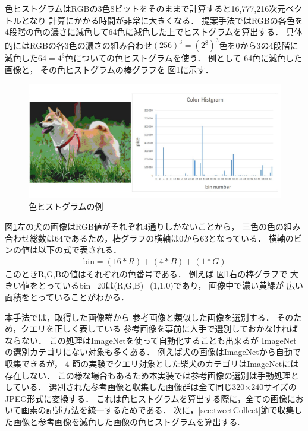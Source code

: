 \documentclass{deimj}
\begin{document}
色ヒストグラムはRGBの3色8ビットをそのままで計算すると16,777,216次元ベクトルとなり
計算にかかる時間が非常に大きくなる．
提案手法ではRGBの各色を4段階の色の濃さに減色して64色に減色した上でヒストグラムを算出する．
具体的にはRGBの各3色の濃さの組み合わせ$(256)^3=(2^8)^3$色を0から3の4段階に減色した$64=4^3$色についての色ヒストグラムを使う．
例として
64色に減色した画像と，
その色ヒストグラムの棒グラフを
図\ref{fig:color}に示す．
%
\begin{figure}[tb]
 \begin{center}
  \includegraphics[scale=0.28]{colorhist.jpg}
 \end{center}
 \caption{色ヒストグラムの例}
 \label{fig:color}
\end{figure}
%
%
図\ref{fig:color}左の犬の画像はRGB値がそれぞれ4通りしかないことから，
三色の色の組み合わせ総数は64であるため，棒グラフの横軸は0から63となっている．
横軸のビンの値は以下の式で表される．
\begin{eqnarray}
\mbox{bin} = (16 * R) + (4 * B) + (1 * G)
\end{eqnarray}
このときR,G,Bの値はそれぞれの色番号である．
例えば
図\ref{fig:color}右の棒グラフで
大きい値をとっているbin=20は(R,G,B)=(1,1,0)であり，
画像中で濃い黄緑が
広い面積をとっていることがわかる．

本手法では，取得した画像群から
参考画像と類似した画像を選別する．
そのため，クエリを正しく表している
参考画像を事前に人手で選別しておかなければならない．
この処理はImageNetを使って自動化することも出来るが
ImageNetの選別カテゴリにない対象も多くある．
例えば犬の画像はImageNetから自動で収集できるが，
4
節の実験でクエリ対象とした柴犬のカテゴリはImageNetには存在しない．
この様な場合もあるため本実装では参考画像の選別は手動処理としている．
%
選別された参考画像と収集した画像群は全て同じ320$\times$240サイズのJPEG形式に変換する．
これは色ヒストグラムを算出する際に，全ての画像において画素の記述方法を統一するためである．
次に，\ref{sec:tweetCollect}節で収集した画像と参考画像を減色した画像の色ヒストグラムを算出する.
\end{document}

